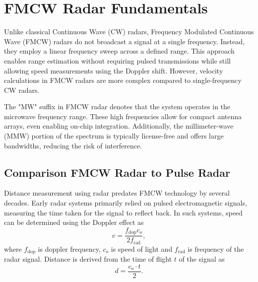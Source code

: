\def\PageLayout{single-no-print}
\def\DocLanguage{en}
\def\PackagesIncludeTikz{yes}
\def\PackagesIncludeBib{yes}










\newcommand{\sidar}{SiRad Easy\textsuperscript{\copyright} }
\newcommand{\boldred}[1]{\textbf{\textcolor{red}{#1}}}
\newcommand{\boldblue}[1]{\textbf{\textcolor{blue}{#1}}}






\tableofcontents

\newpage
{}
\setcounter{page}{1}





\pagestyle{fancy}

\chapter{FMCW Radar Fundamentals}

Unlike classical Continuous Wave (CW) radars, Frequency Modulated Continuous Wave (FMCW) radars do not broadcast a signal at a single frequency.
Instead, they employ a linear frequency sweep across a defined range.
This approach enables range estimation without requiring pulsed transmissions while still allowing speed measurements using the Doppler shift.
However, velocity calculations in FMCW radars are more complex compared to single-frequency CW radars.

The "MW" suffix in FMCW radar denotes that the system operates in the microwave frequency range.
These high frequencies allow for compact antenna arrays, even enabling on-chip integration.
Additionally, the millimeter-wave (MMW) portion of the spectrum is typically license-free \cite{spektrumCTU} and offers large bandwidths, reducing the risk of interference.

\section{Comparison FMCW Radar to Pulse Radar}

Distance measurement using radar predates FMCW technology by several decades.
Early radar systems primarily relied on pulsed electromagnetic signals, measuring the time taken for the signal to reflect back.
In such systems, speed can be determined using the Doppler effect as
\begin{equation}
  v = \frac{f_\mathrm{dop} c_o}{2f_\mathrm{rad}},
  \label{eq:dopler}
\end{equation}
where $f_\mathrm{dop}$ is doppler frequency, $c_o$ is speed of light and $f_\mathrm{rad}$ is frequency of the radar signal.
Distance is derived from the time of flight $t$ of the signal as
\begin{equation}
  d = \frac{c_o \cdot t}{2}.
  \label{eq:distance}
\end{equation}


